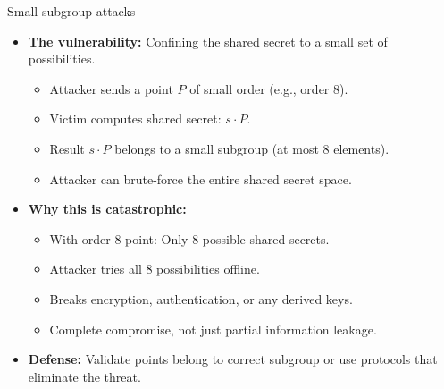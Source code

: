 \documentclass[aspectratio=169, lualatex, handout]{beamer}
\begin{document}
\begin{frame}{Small subgroup attacks}
	\begin{itemize}
		\item \textbf{The vulnerability:} Confining the shared secret to a small set of possibilities.
		      \begin{itemize}
			      \item Attacker sends a point $P$ of small order (e.g., order 8).
			      \item Victim computes shared secret: $s \cdot P$.
			      \item Result $s \cdot P$ belongs to a small subgroup (at most 8 elements).
			      \item Attacker can brute-force the entire shared secret space.
		      \end{itemize}
		\item \textbf{Why this is catastrophic:}
		      \begin{itemize}
			      \item With order-8 point: Only 8 possible shared secrets.
			      \item Attacker tries all 8 possibilities offline.
			      \item Breaks encryption, authentication, or any derived keys.
			      \item Complete compromise, not just partial information leakage.
		      \end{itemize}
		\item \textbf{Defense:} Validate points belong to correct subgroup or use protocols that eliminate the threat.
	\end{itemize}
\end{frame}
\end{document}
